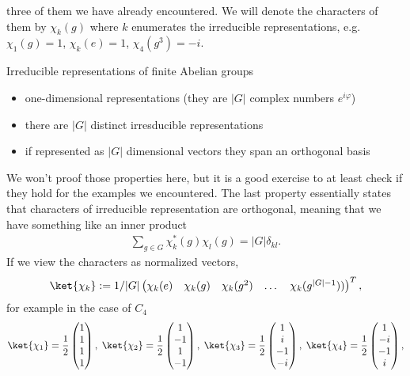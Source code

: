three of them we have already encountered. We will denote the characters of them by $\chi_k(g)$ where $k$ enumerates the irreducible representations, e.g. $\chi_1(g)=1$, $\chi_k(e)=1$, $\chi_4(g^3)=-i$. 
\begin{theorem*}
Irreducible representations of finite Abelian groups
\begin{itemize}
    \item one-dimensional representations (they are $|G|$ complex numbers $e^{i\varphi}$)
    \item there are $|G|$ distinct irresducible representations 
    \item if represented as $|G|$ dimensional vectors they span an orthogonal basis 
\end{itemize}
\end{theorem*}
We won't proof those properties here, but it is a good exercise to at least check if they hold for the examples we encountered.
The last property essentially states that characters of irreducible representation are orthogonal, meaning that we have something like an inner product
\begin{align}
    \sum_{g\in G} \chi_k^*(g) \chi_l(g) = |G|\delta_{kl}.
\end{align}
If we view the characters as normalized vectors, $$\ket{\chi_k} := 1/|G| \begin{pmatrix}\chi_k(e) & \chi_k(g) & \chi_k(g^2) & \dots &\chi_k({g^{|G|-1}}))\end{pmatrix}^T,$$ for example in the case of $C_4$
\begin{align}
    \ket{\chi_1} = \frac{1}{2} \begin{pmatrix}1\\1\\1\\1\end{pmatrix},\;
    \ket{\chi_2} = \frac{1}{2} \begin{pmatrix}1\\-1\\1\\-1\end{pmatrix},\;
    \ket{\chi_3} = \frac{1}{2} \begin{pmatrix}1\\i\\-1\\-i\end{pmatrix},\; 
    \ket{\chi_4} = \frac{1}{2} \begin{pmatrix}1\\-i\\-1\\i\end{pmatrix}, 
\end{align}
